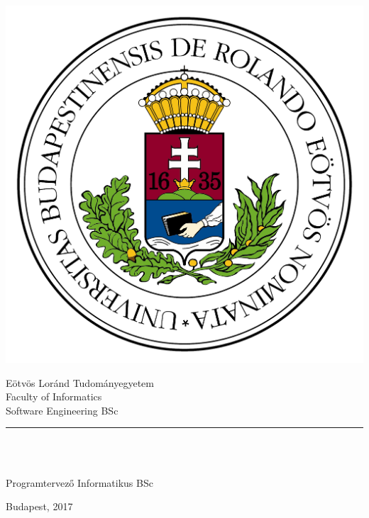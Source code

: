 \begin{titlepage}

\begin{minipage}{0.40\linewidth}
\includegraphics[scale=0.3]{images/elte_logo}
\end{minipage}
\begin{minipage}{0.50\linewidth}
\begin{center}
Eötvös Loránd Tudományegyetem \\
Faculty of Informatics \\
Software Engineering BSc
\end{center}
\end{minipage}

\hrule
\vfill

\begin{center}
\Huge
\textbf{\Title}
\normalsize
\end{center}

\vfill

\begin{minipage}[t]{0.45\linewidth}
\begin{flushleft}
\textbf{\SupervisorName} \\
\SupervisorTitle
\end{flushleft}
\end{minipage}
\begin{minipage}[t]{0.5\linewidth}
\begin{flushright}
\textbf{\Author} \\
Programtervező Informatikus BSc
\end{flushright}
\end{minipage}

\vfill

\begin{center}
Budapest, 2017
\end{center}

\end{titlepage}
